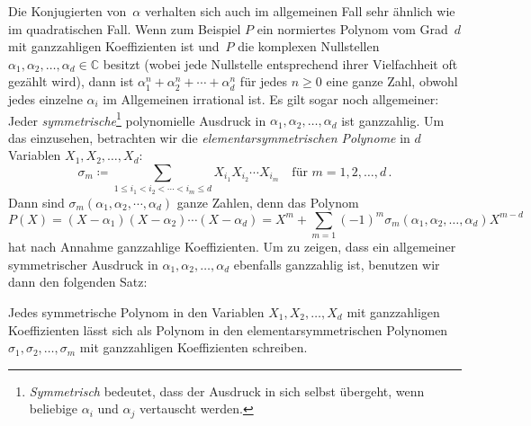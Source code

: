 Die Konjugierten von~$\alpha$ verhalten sich auch im allgemeinen Fall sehr ähnlich wie im quadratischen Fall. Wenn zum Beispiel $P$ ein normiertes Polynom vom Grad~$d$ mit ganzzahligen Koeffizienten ist und~$P$ die komplexen Nullstellen $\alpha_1,\alpha_2,\dotsc,\alpha_d\in\mathbb C$ besitzt (wobei jede Nullstelle entsprechend ihrer Vielfachheit oft gezählt wird), dann ist $\alpha_1^n+\alpha_2^n+\dotsb+\alpha_d^n$ für jedes $n\geqslant 0$ eine ganze Zahl, obwohl jedes einzelne $\alpha_i$ im Allgemeinen irrational ist. Es gilt sogar noch allgemeiner: Jeder \emph{symmetrische}\footnote{\emph{Symmetrisch} bedeutet, dass der Ausdruck in sich selbst übergeht, wenn beliebige $\alpha_i$ und $\alpha_j$ vertauscht werden.} polynomielle Ausdruck in $\alpha_1,\alpha_2,\dotsc,\alpha_d$ ist ganzzahlig. Um das einzusehen, betrachten wir die \emph{elementarsymmetrischen Polynome} in $d$ Variablen $X_1,X_2,\dotsc,X_d$:
\begin{equation*}
	\sigma_m\coloneqq \sum_{1\leqslant i_1 < i_2 < \dotsb < i_m\leqslant d} X_{i_1}X_{i_2}\dotsm X_{i_m}\quad\text{für }m=1,2,\dotsc,d\,.
\end{equation*}
Dann sind $\sigma_m(\alpha_1,\alpha_2,\dotsb,\alpha_d)$ ganze Zahlen, denn das Polynom
\begin{equation*}
	P(X)=(X-\alpha_1)(X-\alpha_2)\dotsm(X-\alpha_d)=X^m+\sum_{m=1}(-1)^m\sigma_m(\alpha_1,\alpha_2,\dotsc,\alpha_d)X^{m-d}
\end{equation*}
hat nach Annahme ganzzahlige Koeffizienten. Um zu zeigen, dass ein allgemeiner symmetrischer Ausdruck in $\alpha_1,\alpha_2,\dotsc,\alpha_d$ ebenfalls ganzzahlig ist, benutzen wir dann den folgenden Satz:
\begin{satzmitnamen}
	Jedes symmetrische Polynom in den Variablen $X_1,X_2,\dotsc,X_d$ mit ganzzahligen Koeffizienten lässt sich als Polynom in den elementarsymmetrischen Polynomen $\sigma_1,\sigma_2,\dotsc,\sigma_m$ mit ganzzahligen Koeffizienten schreiben.%
\end{satzmitnamen}

